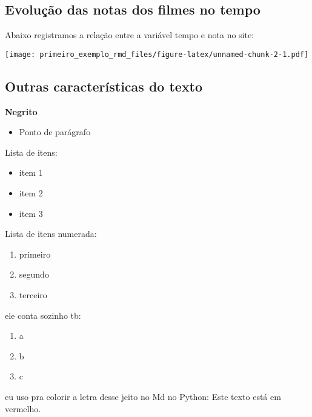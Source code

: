 \documentclass[
]{article}
\providecommand{\tightlist}{%
  \setlength{\itemsep}{0pt}\setlength{\parskip}{0pt}}
\begin{document}
\hypertarget{evoluuxe7uxe3o-das-notas-dos-filmes-no-tempo}{%
\subsection{Evolução das notas dos filmes no
tempo}\label{evoluuxe7uxe3o-das-notas-dos-filmes-no-tempo}}

Abaixo registramos a relação entre a variável tempo e nota no site:

\texttt{[image: primeiro\_exemplo\_rmd\_files/figure-latex/unnamed-chunk-2-1.pdf]}

\hypertarget{outras-caracteruxedsticas-do-texto}{%
\subsection{Outras características do
texto}\label{outras-caracteruxedsticas-do-texto}}

\textbf{Negrito}

\begin{itemize}
\tightlist
\item
  Ponto de parágrafo
\end{itemize}

Lista de itens:

\begin{itemize}
\tightlist
\item
  item 1
\item
  item 2
\item
  item 3
\end{itemize}

Lista de itens numerada:

\begin{enumerate}
\def\labelenumi{\arabic{enumi}.}
\tightlist
\item
  primeiro
\item
  segundo
\item
  terceiro
\end{enumerate}

ele conta sozinho tb:

\begin{enumerate}
\def\labelenumi{\arabic{enumi}.}
\tightlist
\item
  a
\item
  b
\item
  c
\end{enumerate}

eu uso pra colorir a letra desse jeito no Md no Python: {Este texto está
em vermelho.}
\end{document}
